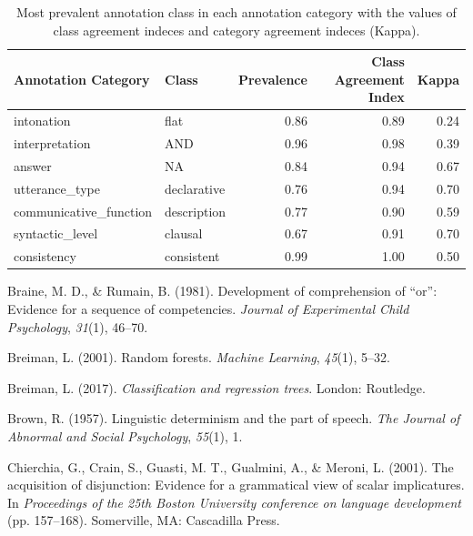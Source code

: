\documentclass[,man,floatsintext]{apa6}
\begin{document}
\begin{table}

\caption{\label{tab:andAgreeStats}Most prevalent annotation class in each annotation category with the values of class agreement indeces and category agreement indeces (Kappa).}
\centering
\begin{tabular}[t]{l|l|r|r|r}
\hline
Annotation Category & Class & Prevalence & Class Agreement Index & Kappa\\
\hline
intonation & flat & 0.86 & 0.89 & 0.24\\
\hline
interpretation & AND & 0.96 & 0.98 & 0.39\\
\hline
answer & NA & 0.84 & 0.94 & 0.67\\
\hline
utterance\_type & declarative & 0.76 & 0.94 & 0.70\\
\hline
communicative\_function & description & 0.77 & 0.90 & 0.59\\
\hline
syntactic\_level & clausal & 0.67 & 0.91 & 0.70\\
\hline
consistency & consistent & 0.99 & 1.00 & 0.50\\
\hline
\end{tabular}
\end{table}

\setlength{\parindent}{-0.5in}
\setlength{\leftskip}{0.5in}

\hypertarget{refs}{}
\leavevmode\hypertarget{ref-braine1981development}{}%
Braine, M. D., \& Rumain, B. (1981). Development of comprehension of ``or'': Evidence for a sequence of competencies. \emph{Journal of Experimental Child Psychology}, \emph{31}(1), 46--70.

\leavevmode\hypertarget{ref-breiman2001random}{}%
Breiman, L. (2001). Random forests. \emph{Machine Learning}, \emph{45}(1), 5--32.

\leavevmode\hypertarget{ref-breiman2017classification}{}%
Breiman, L. (2017). \emph{Classification and regression trees}. London: Routledge.

\leavevmode\hypertarget{ref-brown1957linguistic}{}%
Brown, R. (1957). Linguistic determinism and the part of speech. \emph{The Journal of Abnormal and Social Psychology}, \emph{55}(1), 1.

\leavevmode\hypertarget{ref-chierchia2001acquisition}{}%
Chierchia, G., Crain, S., Guasti, M. T., Gualmini, A., \& Meroni, L. (2001). The acquisition of disjunction: Evidence for a grammatical view of scalar implicatures. In \emph{Proceedings of the 25th Boston University conference on language development} (pp. 157--168). Somerville, MA: Cascadilla Press.
\end{document}
